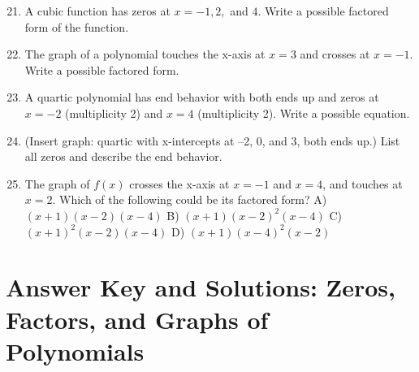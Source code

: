 \documentclass[12pt]{article}
\begin{document}
\begin{enumerate}
  \setcounter{enumi}{20}
  \item A cubic function has zeros at \(x = -1, 2,\) and \(4.\) Write a possible factored form of the function.
  \item The graph of a polynomial touches the x-axis at \(x = 3\) and crosses at \(x = -1.\) Write a possible factored form.
  \item A quartic polynomial has end behavior with both ends up and zeros at \(x = -2\) (multiplicity 2) and \(x = 4\) (multiplicity 2). Write a possible equation.
  \item (Insert graph: quartic with x-intercepts at –2, 0, and 3, both ends up.) List all zeros and describe the end behavior.
  \item The graph of \(f(x)\) crosses the x-axis at \(x = -1\) and \(x = 4\), and touches at \(x = 2.\) Which of the following could be its factored form?  
  A) \((x + 1)(x - 2)(x - 4)\)  
  B) \((x + 1)(x - 2)^2(x - 4)\)  
  C) \((x + 1)^2(x - 2)(x - 4)\)  
  D) \((x + 1)(x - 4)^2(x - 2)\)
\end{enumerate}

\newpage


\section*{Answer Key and Solutions: Zeros, Factors, and Graphs of Polynomials}
\end{document}
